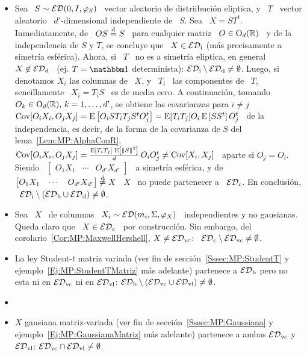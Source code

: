 \begin{itemize}
\item Sea  \ $S \sim  \mathcal{ED}(0,I,\varphi_S)$ \ vector aleatorio  de distriibuci\'on
  eliptica, y  \ $T$  \ vector aleatorio  \ $d'$-dimensional independiente  de \
  $S$. Sea \ $X  = S T^t$. Inmediatamente, de \ $O S  \stackrel{\mathrm{d}}{=} S$ \ para cualquier
  matriz  \ $O  \in \mathrm{O}_d(\mathbb{R})$  \ y  de la  independencia de  $S$ y  $T$, se
  concluye   que  \   $X  \in   \mathcal{ED}_{\mathrm{i}}$  (m\'as   precisamente   a  simetr\'ia
  esf\'erica). Ahora, si  \ $T$ \ no  es a simetr\'ia eliptica, en  general \ $X
  \not\in \mathcal{ED}_{\mathrm{d}}$ \ (ej. $T = \un$ determinista): $\mathcal{ED}_{\mathrm{i}} \setminus \mathcal{ED}_{\mathrm{d}}
  \neq \emptyset$. Luego, si denotamos $X_i$ las  columnas de \ $X$, y \ $T_i$ \
  las componentes de \ $T$, sencillamente \ $X_i  = T_i S$ \ es de media cero. A
  continuaci\'on, tomando  $O_k \in \mathrm{O}_d(\mathbb{R}),  \, k =  1, \ldots ,  d'$, se
  obtiene las covarianzas para $i \ne j$ \ $\operatorname{Cov}[O_i X_i , O_j X_j] = \operatorname{E}\left[
    O_i S T_i T_j S^t O_j^t \right] = \operatorname{E}[T_i T_j] O_i \operatorname{E}\left[ S S^t \right]
  O_j^t$ \ de  la independencia, es decir,  de la forma de la  covarianza de $S$
  del lema~\ref{Lem:MP:AlphaConR},  $\operatorname{Cov}[O_i X_i , O_j  X_j] = \frac{\operatorname{E}\left[
      T_i  T_j  \right] \,  \operatorname{E}\left[  \|S\|^2  \right]}{d}  \, O_i  O_j^t  \ne
  \operatorname{Cov}[X_i , X_j]$ \ aparte si $O_j  = O_i$. Siendo \ $\begin{bmatrix} O_1 X_1 &
    \cdots  & O_{d'} X_{d'}  \end{bmatrix}$ \  a simetr\'ia  esf\'erica, y  de \
  $\begin{bmatrix} O_1 X_1 & \cdots  & O_{d'} X_{d'} \end{bmatrix} \not\stackrel{\mathrm{d}}{=} X$
  \  $X$ \  no puede  partenecer a  \ $\mathcal{ED}_{\mathrm{c}}$.  En conclusi\'on,  \ $\mathcal{ED}_{\mathrm{i}}
  \setminus \left( \mathcal{ED}_{\mathrm{b}} \cup \mathcal{ED}_{\mathrm{d}} \right) \neq \emptyset$.
%
\item Sea  \ $X$ \  de columnas \  $X_i \sim \mathcal{ED}( m_i  , \Sigma ,  \varphi_X)$ \
  independientes  y no  gausianas.  Queda  claro que  \ $X  \in \mathcal{ED}_{\mathrm{c}}$  \ por
  construcci\'on.   Sin embargo, del  corolario~\ref{Cor:MP:MaxwellHershell}, $X
  \ne \mathcal{ED}_{\mathrm{vc}}$: \ $\mathcal{ED}_{\mathrm{c}} \setminus \mathcal{ED}_{\mathrm{vc}} \ne \emptyset$.
%
\item     La    ley     Student-$t$     matriz    variada     (ver    fin     de
  secci\'on~\ref{Sssec:MP:StudentT}  y  ejemplo~\ref{Ej:MP:StudentTMatriz} m\'as
  adelante)  partenece  a  $\mathcal{ED}_{\mathrm{b}}$ pero  no  esta  ni  en $\mathcal{ED}_{\mathrm{vc}}$  ni  en
  $\mathcal{ED}_{\mathrm{vl}}$:  $\mathcal{ED}_{\mathrm{b}}  \setminus  \left(  \mathcal{ED}_{\mathrm{vc}}  \cup
    \mathcal{ED}_{\mathrm{vl}} \right) \neq \emptyset$.
%
\item \SZ{Buscar un que sea vcol, pero no vlin}
%
\item $X$ gausiana matriz-variada (ver fin de secci\'on~\ref{Sssec:MP:Gaussiana}
  y  ejemplo~\ref{Ej:MP:GaussianaMatriz}  m\'as   adelante)  partenece  a  ambas
  $\mathcal{ED}_{\mathrm{vc}}$ y $\mathcal{ED}_{\mathrm{vl}}$: $\mathcal{ED}_{\mathrm{vc}} \cap \mathcal{ED}_{\mathrm{vl}} \neq \emptyset$.
\end{itemize}
